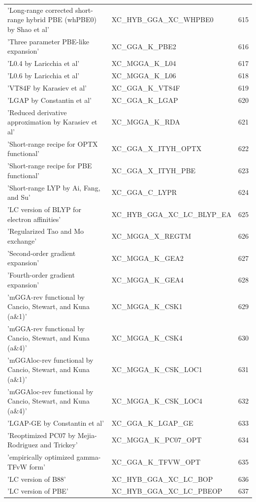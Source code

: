 \documentclass[final,12pt]{article}
\begin{document}
{{{{{{\begin{table}[!h]
\begin{center}
\begin{tabular}{llr}
  'Long-range corrected short-range hybrid PBE (whPBE0) by Shao et al' & XC\_HYB\_GGA\_XC\_WHPBE0  &615\\
  'Three parameter PBE-like expansion' & XC\_GGA\_K\_PBE2  &616\\
  'L0.4 by Laricchia et al' & XC\_MGGA\_K\_L04  &617\\
  'L0.6 by Laricchia et al' & XC\_MGGA\_K\_L06  &618\\
  'VT84F by Karasiev et al' & XC\_GGA\_K\_VT84F  &619\\
  'LGAP by Constantin et al' & XC\_GGA\_K\_LGAP  &620\\
  'Reduced derivative approximation by Karasiev et al' & XC\_MGGA\_K\_RDA  &621\\
  'Short-range recipe for OPTX functional' & XC\_GGA\_X\_ITYH\_OPTX  &622\\
  'Short-range recipe for PBE functional' & XC\_GGA\_X\_ITYH\_PBE  &623\\
  'Short-range LYP by Ai, Fang, and Su' & XC\_GGA\_C\_LYPR  &624\\
  'LC version of BLYP for electron affinities' & XC\_HYB\_GGA\_XC\_LC\_BLYP\_EA  &625\\
  'Regularized Tao and Mo exchange' & XC\_MGGA\_X\_REGTM  &626\\
  'Second-order gradient expansion' & XC\_MGGA\_K\_GEA2  &627\\
  'Fourth-order gradient expansion' & XC\_MGGA\_K\_GEA4  &628\\
  'mGGA-rev functional by Cancio, Stewart, and Kuna (a\&1)' & XC\_MGGA\_K\_CSK1  &629\\
  'mGGA-rev functional by Cancio, Stewart, and Kuna (a\&4)' & XC\_MGGA\_K\_CSK4  &630\\
  'mGGAloc-rev functional by Cancio, Stewart, and Kuna (a\&1)' & XC\_MGGA\_K\_CSK\_LOC1  &631\\
  'mGGAloc-rev functional by Cancio, Stewart, and Kuna (a\&4)' & XC\_MGGA\_K\_CSK\_LOC4  &632\\
  'LGAP-GE by Constantin et al' & XC\_GGA\_K\_LGAP\_GE  &633\\
  'Reoptimized PC07 by Mejia-Rodriguez and Trickey' & XC\_MGGA\_K\_PC07\_OPT  &634\\
  'empirically optimized gamma-TFvW form' & XC\_GGA\_K\_TFVW\_OPT  &635\\
  'LC version of B88' & XC\_HYB\_GGA\_XC\_LC\_BOP  &636\\
  'LC version of PBE' & XC\_HYB\_GGA\_XC\_LC\_PBEOP  &637\\

\end{tabular}
\end{center}
\end{table}}}}}}}
\end{document}
